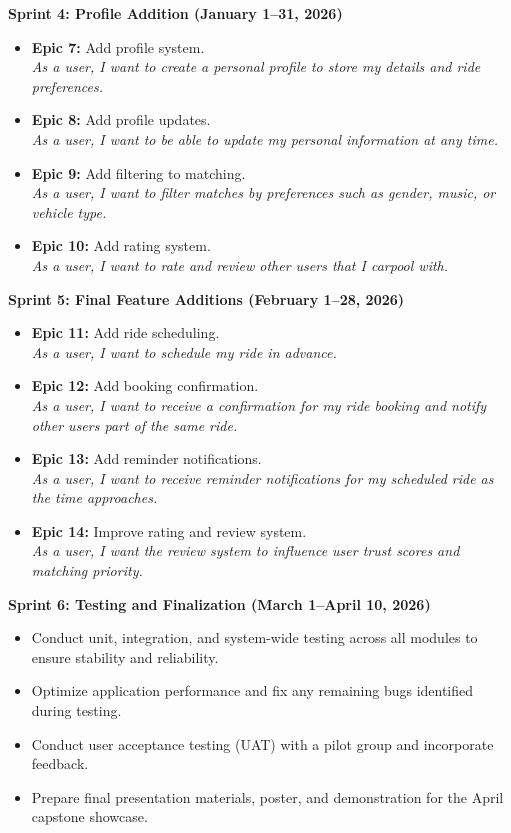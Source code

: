 \documentclass[12pt,letterpaper]{article}
\begin{document}
\textbf{Sprint 4: Profile Addition (January 1--31, 2026)}
\begin{itemize}
    \item \textbf{Epic 7:} Add profile system. \\
    \textit{As a user, I want to create a personal profile to store my details and ride preferences.}

    \item \textbf{Epic 8:} Add profile updates. \\
    \textit{As a user, I want to be able to update my personal information at any time.}

    \item \textbf{Epic 9:} Add filtering to matching. \\
    \textit{As a user, I want to filter matches by preferences such as gender, music, or vehicle type.}

    \item \textbf{Epic 10:} Add rating system. \\
    \textit{As a user, I want to rate and review other users that I carpool with.}
\end{itemize}

\textbf{Sprint 5: Final Feature Additions (February 1--28, 2026)}
\begin{itemize}
    \item \textbf{Epic 11:} Add ride scheduling. \\
    \textit{As a user, I want to schedule my ride in advance.}

    \item \textbf{Epic 12:} Add booking confirmation. \\
    \textit{As a user, I want to receive a confirmation for my ride booking and notify other users part of the same ride.}

    \item \textbf{Epic 13:} Add reminder notifications. \\
    \textit{As a user, I want to receive reminder notifications for my scheduled ride as the time approaches.}

    \item \textbf{Epic 14:} Improve rating and review system. \\
    \textit{As a user, I want the review system to influence user trust scores and matching priority.}
\end{itemize}

\textbf{Sprint 6: Testing and Finalization (March 1--April 10, 2026)}
\begin{itemize}
    \item Conduct unit, integration, and system-wide testing across all modules to ensure stability and reliability.
    \item Optimize application performance and fix any remaining bugs identified during testing.
    \item Conduct user acceptance testing (UAT) with a pilot group and incorporate feedback.
    \item Prepare final presentation materials, poster, and demonstration for the April capstone showcase.
\end{itemize}
\end{document}

